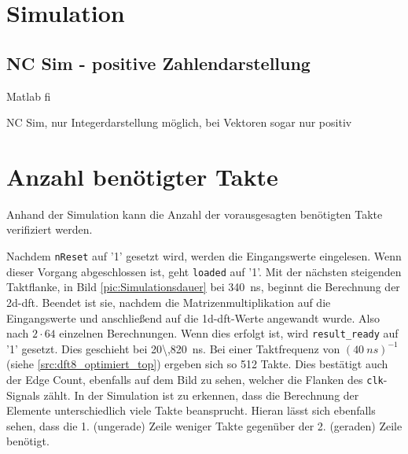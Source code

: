 \section{Simulation}
 \subsection{NC Sim - positive Zahlendarstellung}
Matlab fi
 
 NC Sim, nur Integerdarstellung möglich, bei Vektoren sogar nur positiv 
 \section{Anzahl benötigter Takte}
 Anhand der Simulation kann die Anzahl der vorausgesagten benötigten Takte verifiziert werden. 
 
 Nachdem \texttt{nReset} auf '1' gesetzt wird, werden die Eingangswerte
 eingelesen. Wenn dieser Vorgang abgeschlossen ist, geht \texttt{loaded} auf '1'. Mit der nächsten steigenden Taktflanke, in Bild \ref{pic:Simulationsdauer} bei 
 \SI{340}{ns}, beginnt die Berechnung
 der \gls{2d-dft}. Beendet ist sie, nachdem die Matrizenmultiplikation auf die Eingangswerte und anschließend auf die \gls{1d-dft}-Werte angewandt wurde. Also nach $2 \cdot 64$
 einzelnen Berechnungen. Wenn dies erfolgt ist, wird \texttt{result\_ready} auf '1' gesetzt. Dies geschieht bei \SI{20\,820}{ns}. Bei einer Taktfrequenz von $(\SI{40}{ns})^{-1}$
 (siehe \ref{src:dft8_optimiert_top}) ergeben sich so 512 Takte. Dies bestätigt auch der Edge Count, ebenfalls auf dem Bild zu sehen, welcher die Flanken des \texttt{clk}-Signals 
 zählt. In der Simulation ist zu erkennen, dass die Berechnung der Elemente 
 unterschiedlich viele Takte beansprucht. Hieran lässt sich ebenfalls sehen, dass die 1. (ungerade) Zeile weniger Takte gegenüber der 2. (geraden) Zeile benötigt. 
 
 
